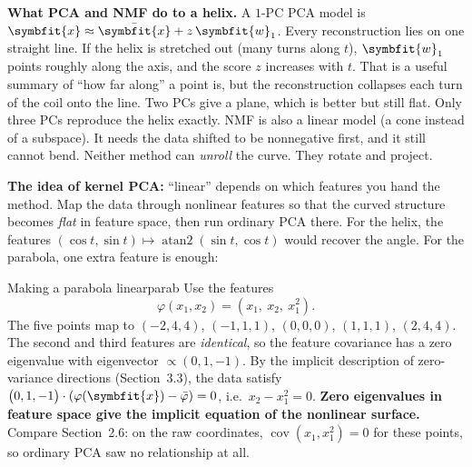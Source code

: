 \documentclass[11pt]{article}
\newcommand{\bm}[1]{\symbfit{#1}}
\newcommand{\vx}{\bm{x}}
\newcommand{\vw}{\bm{w}}
\newcommand{\xbar}{\bar{\bm{x}}}
\begin{document}
\begin{intuition}
\textbf{What PCA and NMF do to a helix.} A $1$-PC PCA model is $\vx\approx\xbar+z\,\vw_1$.
Every reconstruction lies on one straight line. If the helix is stretched out
(many turns along $t$), $\vw_1$ points roughly along the axis, and the score $z$ increases
with $t$. That is a useful summary of ``how far along'' a point is, but the reconstruction
collapses each turn of the coil onto the line. Two PCs give a plane, which is better but
still flat. Only three PCs reproduce the helix exactly. NMF is also a linear model (a cone
instead of a subspace). It needs the data shifted to be nonnegative first, and it still
cannot bend. Neither method can \emph{unroll} the curve. They rotate and project.
\end{intuition}

\textbf{The idea of kernel PCA:} ``linear'' depends on which features you hand the method.
Map the data through nonlinear features so that the curved structure becomes \emph{flat} in
feature space, then run ordinary PCA there. For the helix, the features
$(\cos t,\sin t)\mapsto\operatorname{atan2}(\sin t,\cos t)$ would recover the angle. For the
parabola, one extra feature is enough:

\begin{example}{Making a parabola linear}{parab}
Use the features
\[\varphi(x_1,x_2)=(x_1,\ x_2,\ x_1^2).\]
The five points map to $(-2,4,4)$, $(-1,1,1)$, $(0,0,0)$, $(1,1,1)$, $(2,4,4)$. The second and third features are
\emph{identical}, so the feature covariance has a zero eigenvalue with eigenvector
$\propto(0,1,-1)$. By the implicit description of zero-variance directions
(Section~3.3), the data satisfy $\big(0,1,-1\big)\cdot(\varphi(\vx)-\bar{\varphi})=0$, i.e.\
$x_2-x_1^2=0$. \textbf{Zero eigenvalues in feature space give the implicit equation of the nonlinear surface.}
Compare Section~2.6: on the raw coordinates, $\operatorname{cov}(x_1,x_1^2)=0$ for these points, so
ordinary PCA saw no relationship at all.
\end{example}
\end{document}
